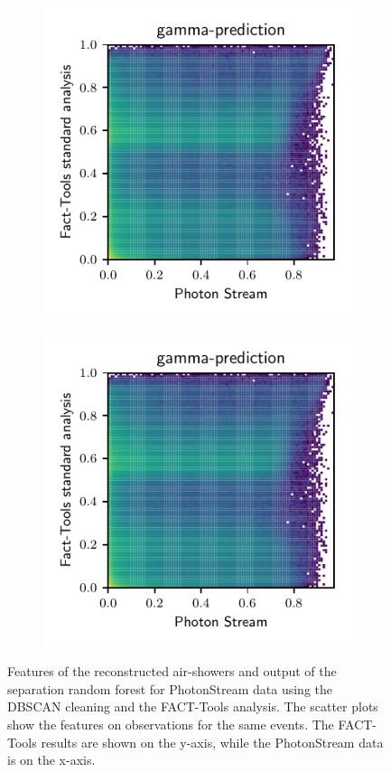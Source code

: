 \begin{figure}
\begin{subfigure}{0.5\textwidth}
  \end{subfigure}
  \begin{subfigure}{0.5\textwidth}
    \centering
    \includegraphics[width=\textwidth, page=3]{Plots/comparison_data_dl3.pdf}
  \end{subfigure}
  \begin{subfigure}{0.5\textwidth}
    \centering
    \includegraphics[width=\textwidth, page=4]{Plots/comparison_data_dl3.pdf}
  \end{subfigure}
  \caption{Features of the reconstructed air-showers and output of the separation random forest for PhotonStream data using the DBSCAN cleaning and the FACT-Tools analysis. The scatter plots show the features on observations for the same events. The FACT-Tools results are shown on the y-axis, while the PhotonStream data is on the x-axis.}
\end{figure}
